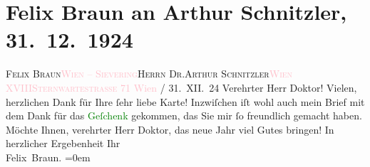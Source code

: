 

               \section[Felix Braun an Arthur Schnitzler, 31. 12. 1924]{ Felix Braun an Arthur Schnitzler, 31. 12. 1924}\nopagebreak{}\rehead{ }\normalsize\beginnumbering{} \toendnotes[C]{\smallbreak\pagebreak[2]} 
\toendnotes[C]{\smallbreak}\pstart{}{\pb}\textsc{Felix Braun}\pend{}\pstart{}\textcolor{pink}{\textsc{Wien – Sievering}}{}\ledrightnote{\textcolor{pink}{Sievering}}\pend{}{\bigskip}\pstart{}\textsc{Herrn Dr.}\pend{}\pstart{}\textsc{Arthur Schnitzler}\pend{}\pstart{}\textcolor{pink}{\textsc{Wien XVIII}}{}\ledrightnote{\textcolor{pink}{XVIII., Währing}}\pend{}\pstart{}\textcolor{pink}{\textsc{Sternwartestraße 71}}{}\ledrightnote{\textcolor{pink}{Sternwartestraße}}\pend{}{\bigskip}\pstart
           \centering{}{\pb}\textcolor{pink}{Wien}{}\ledrightnote{\textcolor{pink}{Wien}} / 31. XII. 24\pend
           \pstart{}Verehrter Herr Doktor!\pend\pstart
           Vielen, herzlichen Dank für Ihre ſehr liebe Karte! Inzwiſchen iſt wohl auch mein
                    Brief mit dem Dank für das \textcolor{green}{Geſchenk}{} gekommen, das Sie mir ſo freundlich gemacht haben. Möchte
                    Ihnen, verehrter Herr Doktor, das neue Jahr viel Gutes bringen!\pend
           \pstart
           In herzlicher Ergebenheit Ihr{\\[\baselineskip]}\spacefill\mbox{Felix Braun.}\pend
           \leftskip=0em{}\endnumbering{}  
      
